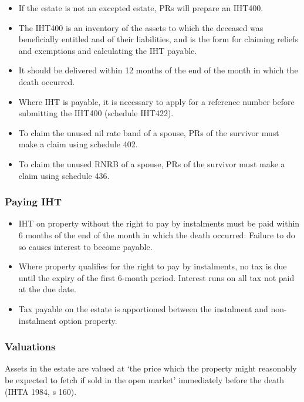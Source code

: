 \documentclass[
]{article}
\providecommand{\tightlist}{%
  \setlength{\itemsep}{0pt}\setlength{\parskip}{0pt}}
\begin{document}
\begin{itemize}
\tightlist
\item
  If the estate is not an excepted estate, PRs will prepare an IHT400.
\item
  The IHT400 is an inventory of the assets to which the deceased was
  beneficially entitled and of their liabilities, and is the form for
  claiming reliefs and exemptions and calculating the IHT payable.
\item
  It should be delivered within 12 months of the end of the month in
  which the death occurred.
\item
  Where IHT is payable, it is necessary to apply for a reference number
  before submitting the IHT400 (schedule IHT422).
\item
  To claim the unused nil rate band of a spouse, PRs of the survivor
  must make a claim using schedule 402.\\
\item
  To claim the unused RNRB of a spouse, PRs of the survivor must make a
  claim using schedule 436.
\end{itemize}

\hypertarget{paying-iht}{%
\subsubsection{Paying IHT}\label{paying-iht}}

\begin{itemize}
\tightlist
\item
  IHT on property without the right to pay by instalments must be paid
  within 6 months of the end of the month in which the death occurred.
  Failure to do so causes interest to become payable.
\item
  Where property qualifies for the right to pay by instalments, no tax
  is due until the expiry of the first 6-month period. Interest runs on
  all tax not paid at the due date.
\item
  Tax payable on the estate is apportioned between the instalment and
  non-instalment option property.
\end{itemize}

\hypertarget{valuations}{%
\subsubsection{Valuations}\label{valuations}}

Assets in the estate are valued at `the price which the property might
reasonably be expected to fetch if sold in the open market' immediately
before the death (IHTA 1984, s 160).
\end{document}
